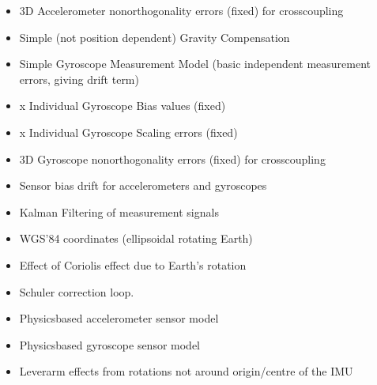 \documentclass[letterpaper,10pt,english]{sphinxmanual}
\begin{document}
\begin{fulllineitems}
\begin{description}
\begin{itemize}
\item {} 
\sphinxAtStartPar
3D Accelerometer non\sphinxhyphen{}orthogonality errors (fixed) for cross\sphinxhyphen{}coupling

\item {} 
\sphinxAtStartPar
Simple (not position dependent) Gravity Compensation

\item {} 
\sphinxAtStartPar
Simple Gyroscope Measurement Model (basic \sphinxhyphen{} independent
measurement errors, giving drift term)

\item {} 
 x Individual Gyroscope Bias values (fixed)

\item {} 
 x Individual Gyroscope Scaling errors (fixed)

\item {} 
\sphinxAtStartPar
3D Gyroscope non\sphinxhyphen{}orthogonality errors (fixed) for cross\sphinxhyphen{}coupling

\item {} 
\sphinxAtStartPar
Sensor bias drift for accelerometers and gyroscopes

\item {} 
\sphinxAtStartPar
Kalman Filtering of measurement signals

\item {} 
\sphinxAtStartPar
WGS’84 coordinates (ellipsoidal rotating Earth)

\item {} 
\sphinxAtStartPar
Effect of Coriolis effect due to Earth’s rotation

\end{itemize}

\begin{itemize}
\item {} 
\sphinxAtStartPar
Schuler correction loop.

\item {} 
\sphinxAtStartPar
Physics\sphinxhyphen{}based accelerometer sensor model

\item {} 
\sphinxAtStartPar
Physics\sphinxhyphen{}based gyroscope sensor model

\item {} 
\sphinxAtStartPar
Lever\sphinxhyphen{}arm effects from rotations not around origin/centre of the IMU

\end{itemize}


\end{description}
\end{fulllineitems}
\end{document}
